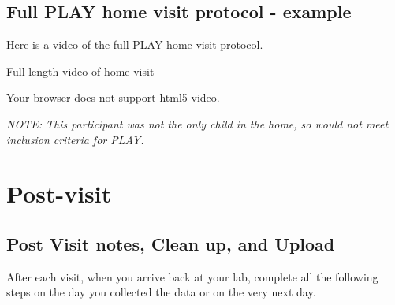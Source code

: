 \documentclass[
]{book}
\begin{document}
\hypertarget{full-play-home-visit-protocol---example-1}{%
\section{Full PLAY home visit protocol - example}\label{full-play-home-visit-protocol---example-1}}

Here is a video of the full PLAY home visit protocol.

Full-length video of home visit

\leavevmode{}%
Your browser does not support html5 video.

\emph{NOTE: This participant was not the only child in the home, so would not meet inclusion criteria for PLAY.}

\hypertarget{post-visit}{%
\chapter{Post-visit}\label{post-visit}}

\hypertarget{post-visit-notes-clean-up-and-upload}{%
\section{Post Visit notes, Clean up, and Upload}\label{post-visit-notes-clean-up-and-upload}}

After each visit, when you arrive back at your lab, complete all the following steps on the day you collected the data or on the very next day.
\end{document}
